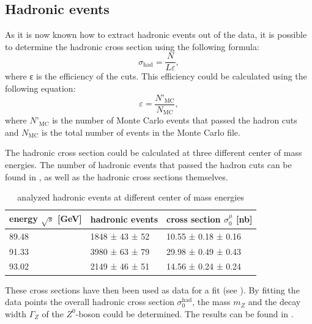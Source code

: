 \documentclass[epj,nopacs]{svjour}
\begin{document}
\subsection{Hadronic events}
As it is now known how to extract hadronic events out of the data, it is
possible to determine the hadronic cross section using the following formula:
\begin{equation}
σ_{\mathrm{had}} = \frac{N}{Lε},
\end{equation}
where ε is the efficiency of the cuts. This efficiency could be calculated
using the following equation:
\begin{equation}
ε = \frac{N’_{\mathrm{MC}}}{N_{\mathrm{MC}}},
\end{equation}
where $N’_{\mathrm{MC}}$ is the number of Monte Carlo events that passed the
hadron cuts and $N_{\mathrm{MC}}$ is the total number of events in the Monte
Carlo file.

The hadronic cross section could be calculated at three different center of
mass energies. The number of hadronic events that passed the hadron cuts can be
found in , as well as the hadronic cross sections themselves.

\begin{table}[h]
\begin{center}
\begin{tabular}{|l|l|l|}
\hline
energy $\sqrt{s}$ [\si{\GeV}] & hadronic events & cross section $σ_0^μ$ [\si{\nano\barn}]\\
\hline
89.48 & 1848 ± 43 ± 52 & 10.55 ± 0.18 ± 0.16 \\
91.33 & 3980 ± 63 ± 79 & 29.98 ± 0.49 ± 0.43 \\
93.02 & 2149 ± 46 ± 51 & 14.56 ± 0.24 ± 0.24 \\
\hline
\end{tabular}
\vspace*{0.3cm}
\caption{\baselineskip=0.38cm analyzed hadronic events at different center of mass energies}
\label{tab:hadr_events}
\end{center}
\vspace*{-0.5cm}
\end{table}

These cross sections have then been used as data for a fit (see
). By fitting the data
points the overall hadronic cross section $σ_0^{\mathrm{had}}$, the mass $m_Z$ and the decay width $Γ_Z$
of the $Z^0$-boson could be determined. The results can be found in
.
\end{document}
